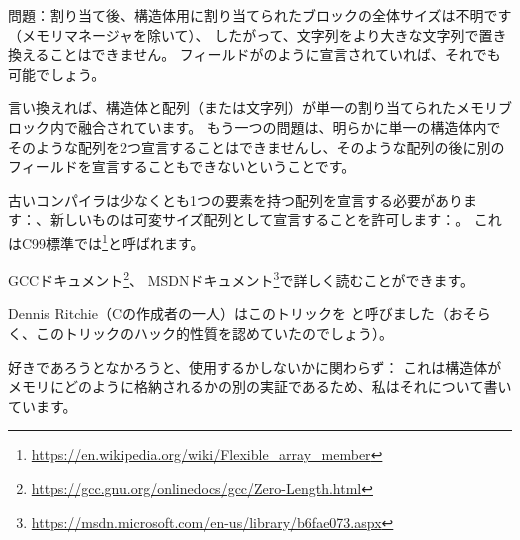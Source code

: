 問題：割り当て後、構造体用に割り当てられたブロックの全体サイズは不明です（メモリマネージャを除いて）、
したがって、文字列をより大きな文字列で置き換えることはできません。
フィールドがのように宣言されていれば、それでも可能でしょう。

言い換えれば、構造体と配列（または文字列）が単一の割り当てられたメモリブロック内で融合されています。
もう一つの問題は、明らかに単一の構造体内でそのような配列を2つ宣言することはできませんし、そのような配列の後に別のフィールドを宣言することもできないということです。

古いコンパイラは少なくとも1つの要素を持つ配列を宣言する必要があります：、新しいものは可変サイズ配列として宣言することを許可します：。
これはC99標準では\footnote{\url{https://en.wikipedia.org/wiki/Flexible_array_member}}と呼ばれます。

GCCドキュメント\footnote{\url{https://gcc.gnu.org/onlinedocs/gcc/Zero-Length.html}}、
MSDNドキュメント\footnote{\url{https://msdn.microsoft.com/en-us/library/b6fae073.aspx}}で詳しく読むことができます。

Dennis Ritchie（Cの作成者の一人）はこのトリックを
と呼びました（おそらく、このトリックのハック的性質を認めていたのでしょう）。

好きであろうとなかろうと、使用するかしないかに関わらず：
これは構造体がメモリにどのように格納されるかの別の実証であるため、私はそれについて書いています。